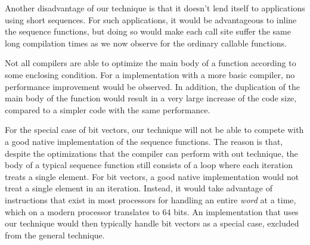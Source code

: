 Another disadvantage of our technique is that it doesn't lend itself
to applications using short sequences.  For such applications, it
would be advantageous to inline the sequence functions, but doing so
would make each call site suffer the same long compilation times as we
now observe for the ordinary callable functions.

Not all compilers are able to optimize the main body of a function
according to some enclosing condition.  For a \commonlisp{}
implementation with a more basic compiler, no performance improvement
would be observed.  In addition, the duplication of the main body of
the function would result in a very large increase of the code size,
compared to a simpler code with the same performance.

For the special case of bit vectors, our technique will not be able to
compete with a good native implementation of the sequence functions.
The reason is that, despite the optimizations that the compiler can
perform with out technique, the body of a typical sequence function
still consists of a loop where each iteration treats a single
element.  For bit vectors, a good native implementation would not
treat a single element in an iteration.  Instead, it would take
advantage of instructions that exist in most processors for handling
an entire \emph{word} at a time, which on a modern processor
translates to $64$ bits.  An implementation that uses our technique
would then typically handle bit vectors as a special case, excluded
from the general technique.
